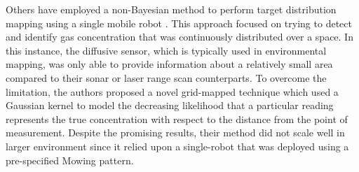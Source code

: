 \documentclass[letterpaper, 10 pt, conference]{ieeeconf}
\newcommand{\Ram}[1]{{\normalsize{\textbf{({\color{green}Ram:\ }#1)}}}}
\newcommand{\HJ}[1]{{\color{black}{#1}}}
\begin{document}



Others have employed a non-Bayesian method to perform target distribution mapping using a single mobile robot \cite{lilienthal2009statistical}.
This approach focused on trying to detect and identify gas concentration that was continuously distributed over a space.
In this instance, the diffusive sensor, which is typically used in environmental mapping, was only able to provide information about a relatively small area compared to their sonar or laser range scan counterparts.
To overcome the limitation, the authors proposed a novel grid-mapped technique which used a Gaussian kernel to model the decreasing likelihood that a particular reading represents the true concentration with respect to the distance from the point of measurement. 
Despite the promising results, their method did not scale well in larger environment since it relied upon a single-robot that was deployed using a pre-specified Mowing pattern. 

\end{document}
